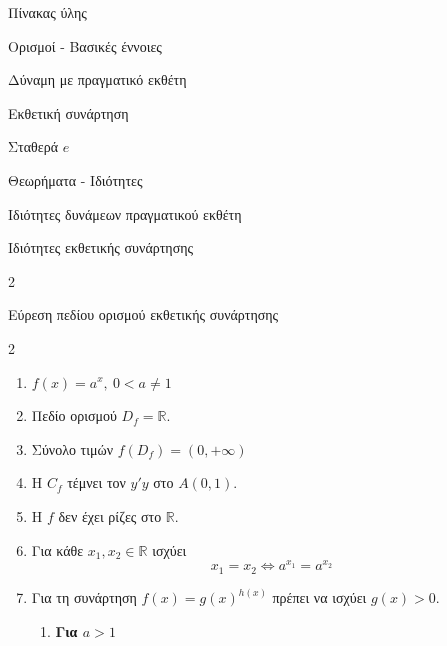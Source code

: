 \documentclass[twoside,nofonts,internet,math,spyros]{frontisthrio}
\newcommand{\myitem}{\stepcounter{enumi}\item[\raisebox{0.5mm}{\faEdit}\ \Large$\square$]}
\begin{document}
\begin{mybox}[mysubtitle]{Πίνακας ύλης}
\begin{tcbraster}[raster columns=2,raster equal height]
\begin{myleftbox}{Ορισμοί - Βασικές έννοιες\ \ \faBook}
\begin{arithmisi}[itemsep=0mm]
\item Δύναμη με πραγματικό εκθέτη
\item Εκθετική συνάρτηση
\item Σταθερά $ e $
\end{arithmisi}
\end{myleftbox}
\begin{myrightbox}{Θεωρήματα - Ιδιότητες\ \ \faTools}
\begin{arithmisi}[itemsep=0mm]
\item Ιδιότητες δυνάμεων πραγματικού εκθέτη
\item Ιδιότητες εκθετικής συνάρτησης
\end{arithmisi}
\end{myrightbox}
\end{tcbraster}
\begin{multicols}{2}
\begin{todolist}[itemsep=0mm]
\myitem Εύρεση πεδίου ορισμού εκθετικής συνάρτησης
\end{todolist}
\end{multicols}
\begin{multicols}{2}
\begin{enumerate}[itemsep=0mm,leftmargin=3mm]
\item $ f(x)=a^x,\ 0<a\neq 1 $
\item Πεδίο ορισμού $ D_f=\mathbb{R} $.
\item Σύνολο τιμών $ f(D_f)=(0,+\infty) $
\item Η $ C_f $ τέμνει τον $ y'y $ στο $ A(0,1) $.
\item Η $ f $ δεν έχει ρίζες στο $ \mathbb{R} $.
\item Για κάθε $ x_1,x_2\in\mathbb{R} $ ισχύει
\[ x_1=x_2\Leftrightarrow a^{x_1}=a^{x_2} \]
\item Για τη συνάρτηση $ f(x)=g(x)^{h(x)} $ πρέπει να ισχύει $ g(x)>0 $.
\begin{enumerate}[itemsep=0mm,label=\bf\arabic*.,leftmargin=0cm]
\item[\textbf{A.}] \textbf{Για {\boldmath$ a>1 $}}
\begin{itemize}[leftmargin=4mm]

\end{itemize}
\end{enumerate}
\end{enumerate}
\end{multicols}
\end{mybox}
\end{document}
